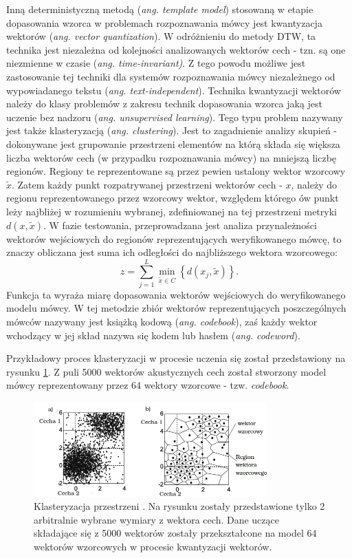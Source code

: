Inną deterministyczną metodą (\textit{ang. template model}) stosowaną w etapie dopasowania wzorca w problemach rozpoznawania mówcy jest kwantyzacja wektorów (\textit{ang. vector quantization}). W odróżnieniu do metody DTW, ta technika jest niezależna od kolejności analizowanych wektorów cech - tzn. są one niezmienne w czasie (\textit{ang. time-invariant)}. Z tego powodu możliwe jest zastosowanie tej techniki dla systemów rozpoznawania mówcy niezależnego od wypowiadanego tekstu (\textit{ang. text-independent}). 
Technika kwantyzacji wektorów należy do klasy problemów z zakresu technik dopasowania wzorca jaką jest uczenie bez nadzoru  (\textit{ang. unsupervised learning}). Tego typu problem nazywany jest także \cite{fosr} klasteryzacją (\textit{ang. clustering}). Jest to zagadnienie analizy skupień - dokonywane jest grupowanie przestrzeni elementów na którą składa się większa liczba wektorów cech (w przypadku rozpoznawania mówcy) na mniejszą liczbę regionów. Regiony te reprezentowane są przez pewien ustalony wektor wzorcowy $ \tilde{x}$. Zatem każdy punkt rozpatrywanej przestrzeni wektorów cech - $x$, należy do regionu reprezentowanego przez wzorcowy wektor, względem którego ów punkt leży najbliżej w rozumieniu wybranej, zdefiniowanej na tej przestrzeni metryki $d(x,\tilde{x})$.
W fazie testowania, przeprowadzana jest analiza przynależności wektorów wejściowych do regionów reprezentujących weryfikowanego mówcę, to znaczy obliczana jest suma ich odległości do najbliższego wektora wzorcowego:
\begin{equation}
  z = \sum_{j=1}^{L} \min_{\tilde{x} \in  C} \left\{ d(x_j, \tilde{x}) \right\}. 
\end{equation}
Funkcja ta wyraża miarę dopasowania wektorów wejściowych do weryfikowanego modelu mówcy. 
W tej metodzie zbiór wektorów reprezentujących poszczególnych mówców nazywany jest książką kodową (\textit{ang. codebook}), zaś każdy wektor wchodzący w jej skład nazywa się kodem lub hasłem (\textit{ang. codeword}).

Przykładowy proces klasteryzacji w procesie uczenia się został przedstawiony na rysunku \ref{fig:VQjpg}. Z puli 5000 wektorów akustycznych cech został stworzony model mówcy reprezentowany przez 64 wektory wzorcowe - tzw. \textit{codebook}.

\begin{figure}[ht!]
  \centering
    \includegraphics[width=0.8\textwidth]{overwiewVQ.jpg}
    
    \caption{\label{fig:VQjpg}Klasteryzacja przestrzeni \cite{overview}. Na rysunku zostały przedstawione tylko 2 arbitralnie wybrane wymiary z wektora cech. Dane uczące składające się z 5000 wektorów zostały przekształcone na model 64 wektorów wzorcowych w procesie kwantyzacji wektorów.}
\end{figure}

